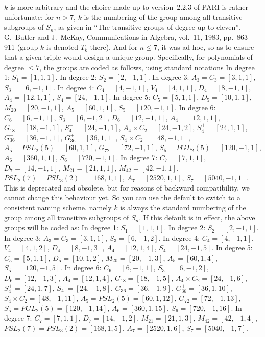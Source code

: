 $k$ is more arbitrary and the choice made up to version~2.2.3 of PARI is rather
unfortunate: for $n > 7$, $k$ is the numbering of the group among all
transitive subgroups of $S_n$, as given in ``The transitive groups of degree up
to eleven'', G.~Butler and J.~McKay, Communications in Algebra, vol.~11, 1983,
pp.~863--911 (group $k$ is denoted $T_k$ there). And for $n \leq 7$, it was ad
hoc, so as to ensure that a given triple would design a unique group.
Specifically, for polynomials of degree $\leq 7$, the groups are coded as
follows, using standard notations
\smallskip
In degree 1: $S_1=[1,1,1]$.
\smallskip
In degree 2: $S_2=[2,-1,1]$.
\smallskip
In degree 3: $A_3=C_3=[3,1,1]$, $S_3=[6,-1,1]$.
\smallskip
In degree 4: $C_4=[4,-1,1]$, $V_4=[4,1,1]$, $D_4=[8,-1,1]$, $A_4=[12,1,1]$,
$S_4=[24,-1,1]$.
\smallskip
In degree 5: $C_5=[5,1,1]$, $D_5=[10,1,1]$, $M_{20}=[20,-1,1]$,
 $A_5=[60,1,1]$, $S_5=[120,-1,1]$.
\smallskip
In degree 6: $C_6=[6,-1,1]$, $S_3=[6,-1,2]$, $D_6=[12,-1,1]$, $A_4=[12,1,1]$,
$G_{18}=[18,-1,1]$, $S_4^-=[24,-1,1]$, $A_4\times C_2=[24,-1,2]$,
$S_4^+=[24,1,1]$, $G_{36}^-=[36,-1,1]$, $G_{36}^+=[36,1,1]$,
$S_4\times C_2=[48,-1,1]$, $A_5=PSL_2(5)=[60,1,1]$, $G_{72}=[72,-1,1]$,
$S_5=PGL_2(5)=[120,-1,1]$, $A_6=[360,1,1]$, $S_6=[720,-1,1]$.
\smallskip
In degree 7: $C_7=[7,1,1]$, $D_7=[14,-1,1]$, $M_{21}=[21,1,1]$,
$M_{42}=[42,-1,1]$, $PSL_2(7)=PSL_3(2)=[168,1,1]$, $A_7=[2520,1,1]$,
$S_7=[5040,-1,1]$.
\smallskip
This is deprecated and obsolete, but for reasons of backward compatibility,
we cannot change this behaviour yet. So you can use the default
 to switch to a consistent naming scheme, namely $k$ is
always the standard numbering of the group among all transitive subgroups of
$S_n$. If this default is in effect, the above groups will be coded as:
\smallskip
In degree 1: $S_1=[1,1,1]$.
\smallskip
In degree 2: $S_2=[2,-1,1]$.
\smallskip
In degree 3: $A_3=C_3=[3,1,1]$, $S_3=[6,-1,2]$.
\smallskip
In degree 4: $C_4=[4,-1,1]$, $V_4=[4,1,2]$, $D_4=[8,-1,3]$, $A_4=[12,1,4]$,
$S_4=[24,-1,5]$.
\smallskip
In degree 5: $C_5=[5,1,1]$, $D_5=[10,1,2]$, $M_{20}=[20,-1,3]$,
 $A_5=[60,1,4]$, $S_5=[120,-1,5]$.
\smallskip
In degree 6: $C_6=[6,-1,1]$, $S_3=[6,-1,2]$, $D_6=[12,-1,3]$, $A_4=[12,1,4]$,
$G_{18}=[18,-1,5]$, $A_4\times C_2=[24,-1,6]$, $S_4^+=[24,1,7]$,
$S_4^-=[24,-1,8]$, $G_{36}^-=[36,-1,9]$, $G_{36}^+=[36,1,10]$,
$S_4\times C_2=[48,-1,11]$, $A_5=PSL_2(5)=[60,1,12]$, $G_{72}=[72,-1,13]$,
$S_5=PGL_2(5)=[120,-1,14]$, $A_6=[360,1,15]$, $S_6=[720,-1,16]$.
\smallskip
In degree 7: $C_7=[7,1,1]$, $D_7=[14,-1,2]$, $M_{21}=[21,1,3]$,
$M_{42}=[42,-1,4]$, $PSL_2(7)=PSL_3(2)=[168,1,5]$, $A_7=[2520,1,6]$,
$S_7=[5040,-1,7]$.
\smallskip

